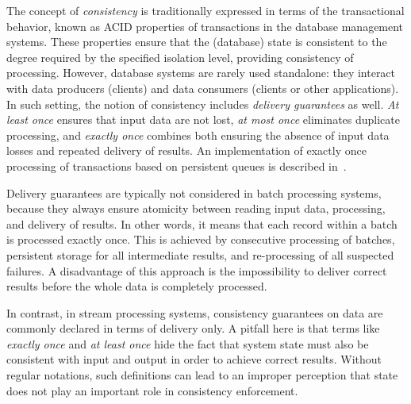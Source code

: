 \label{fs-preliminaries}

The concept of {\em consistency} is traditionally expressed in terms of the transactional behavior, known as ACID properties of transactions in the database management systems. These properties ensure that the (database) state is consistent to the degree required by the specified isolation level, providing consistency of processing. However, database systems are rarely used standalone: they interact with data producers (clients) and data consumers (clients or other applications). In such setting, the notion of consistency includes {\em delivery guarantees} as well. {\em At least once}  ensures that input data are not lost, {\em at most once} eliminates duplicate processing, and {\em exactly once} combines both ensuring the absence of input data losses and repeated delivery of results. An implementation of exactly once processing of transactions based on persistent queues is described in~\cite{DBLP:books/mk/WeikumV2002}.



Delivery guarantees are typically not considered in batch processing systems, because they always ensure atomicity between reading input data, processing, and delivery of results. In other words, it means that each record within a batch is processed exactly once. This is achieved by consecutive processing of batches, persistent storage for all intermediate results, and re-processing of all suspected failures. A disadvantage of this approach is the impossibility to deliver correct results before the whole data is completely processed.

In contrast, in stream processing systems, consistency guarantees on data are commonly declared in terms of delivery only. A pitfall here is that terms like {\em exactly once} and {\em at least once} hide the fact that system state must also be consistent with input and output in order to achieve correct results. Without regular notations, such definitions can lead to an improper perception that state does not play an important role in consistency enforcement. 

